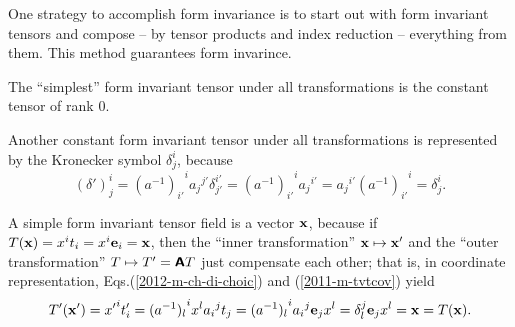 One strategy to accomplish  form invariance  is to start out with form invariant
tensors and compose -- by tensor products and index reduction -- everything from them. This method guarantees form
invarince.

{
\color{blue}
\bexample

The ``simplest'' form invariant tensor under all transformations is the constant tensor of rank $0$.

Another constant form invariant tensor  under all transformations is represented by the Kronecker symbol $\delta^i_j$,
because
\begin{equation}
{(\delta ')}^i_j= {(a^{-1})_{i'}}^i {a_j}^{j'}\delta^{i'}_{j'}={(a^{-1})_{i'}}^i {a_j}^{i'}= {a_j}^{i'}{(a^{-1})_{i'}}^i=\delta^i_j
.
\end{equation}

A simple form invariant tensor field is a vector ${\bf x}$,
because if $T({\bf x})= x^i t_i= x^i {\bf e}_i={\bf x}$, then
the ``inner transformation''
${\bf x} \mapsto  {\bf x}'$
and the ``outer transformation''
$T \mapsto  T'= \textsf{\textbf{A}}T$
just compensate each other; that is, in coordinate representation, Eqs.(\ref{2012-m-ch-di-choic}) and (\ref{2011-m-tvtcov}) yield
\begin{equation}
T'({\bf x}')= {x'}^i t'_i= {(a^{-1})_l}^i x^l   {a_i}^j t_j = {(a^{-1})_l}^i  {a_i}^j {\bf e}_j  x^l
= \delta_l^j {\bf e}_j  x^l = {\bf x} = T({\bf x}).
\end{equation}



}
